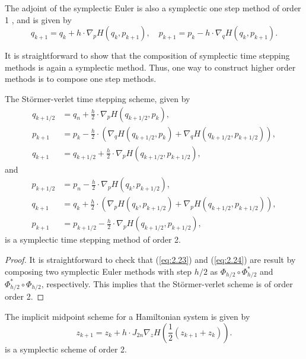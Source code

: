 The adjoint of the symplectic Euler is also a symplectic one step method of order 1 \cite{hairer2006geometric}, and is given by
\begin{equation}
	q_{k+1} = q_k + h \cdot \nabla_p H(q_k,p_{k+1}),\quad p_{k+1} = p_k - h \cdot \nabla_q H(q_{k},p_{k+1}).
\end{equation}

It is straightforward to show that the composition of symplectic time stepping methods is again a symplectic method. Thus, one way to construct higher order methods is to compose one step methods.
\begin{theorem}
The St\"ormer-verlet time stepping scheme, given by
\begin{equation} \label{eq:2.23}
\begin{aligned}
	q_{k+1/2} &= q_n + \frac h 2 \cdot \nabla_pH(q_{k+1/2},p_k), \\
	p_{k+1} &= p_k - \frac h 2\cdot (\nabla_qH(q_{k+1/2},p_k) + \nabla_qH(q_{k+1/2},p_{k+1/2}) ), \\
	q_{k+1} &= q_{k+1/2} + \frac h 2 \cdot \nabla_pH(q_{k+1/2},p_{k+1/2}),
\end{aligned}
\end{equation}
and 
\begin{equation} \label{eq:2.24}
\begin{aligned}
	p_{k+1/2} &= p_n - \frac h 2 \cdot \nabla_pH(q_k,p_{k+1/2}), \\
	q_{k+1} &= q_k + \frac h 2\cdot (\nabla_pH(q_k,p_{k+1/2}) + \nabla_pH(q_{k+1/2},p_{k+1/2}) ), \\
	p_{k+1} &= p_{k+1/2} - \frac h 2 \cdot \nabla_pH(q_{k+1/2},p_{k+1/2}),
\end{aligned}
\end{equation}
is a symplectic time stepping method of order 2.
\end{theorem}
\begin{proof}
It is straightforward to check that (\ref{eq:2.23}) and (\ref{eq:2.24}) are result by composing two symplectic Euler methods with step $h/2$ as $\Phi_{h/2}\circ \Phi^*_{h/2}$ and $\Phi^*_{h/2}\circ \Phi_{h/2}$, respectively. This implies that the St\"ormer-verlet scheme is of order order 2.
\end{proof}
\begin{theorem}
The implicit midpoint scheme for a Hamiltonian system is given by
\begin{equation}
	z_{k+1} = z_k + h \cdot J_{2n} \nabla_z H( \frac{1}{2}(z_{k+1} + z_k) ).
\end{equation}
is a symplectic scheme of order 2.
\end{theorem}
